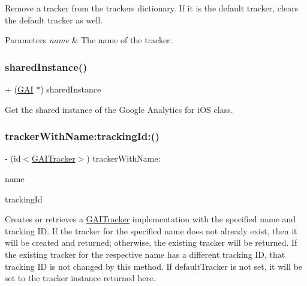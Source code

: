 Remove a tracker from the trackers dictionary. If it is the default tracker, clears the default tracker as well.


\begin{DoxyParams}{Parameters}
{\em name} & The name of the tracker. \\
\hline
\end{DoxyParams}
\mbox{\label{interface_g_a_i_ac150ba078bd1eaf36f9c0652890814f2}} 
\subsubsection{\texorpdfstring{shared\+Instance()}{sharedInstance()}}
{\footnotesize\ttfamily + (\hyperlink{interface_g_a_i}{G\+AI} $\ast$) shared\+Instance \begin{DoxyParamCaption}{ }\end{DoxyParamCaption}}

Get the shared instance of the Google Analytics for i\+OS class. \mbox{\label{interface_g_a_i_a44db9f9fe6a63c95be683ff11813c781}} 
\subsubsection{\texorpdfstring{tracker\+With\+Name\+:tracking\+Id\+:()}{trackerWithName:trackingId:()}}
{\footnotesize\ttfamily -\/ (id$<$\hyperlink{protocol_g_a_i_tracker-p}{G\+A\+I\+Tracker}$>$) tracker\+With\+Name\+: \begin{DoxyParamCaption}\item[{(N\+S\+String $\ast$)}]{name }\item[{trackingId:(N\+S\+String $\ast$)}]{tracking\+Id }\end{DoxyParamCaption}}

Creates or retrieves a \hyperlink{protocol_g_a_i_tracker-p}{G\+A\+I\+Tracker} implementation with the specified name and tracking ID. If the tracker for the specified name does not already exist, then it will be created and returned; otherwise, the existing tracker will be returned. If the existing tracker for the respective name has a different tracking ID, that tracking ID is not changed by this method. If default\+Tracker is not set, it will be set to the tracker instance returned here.


